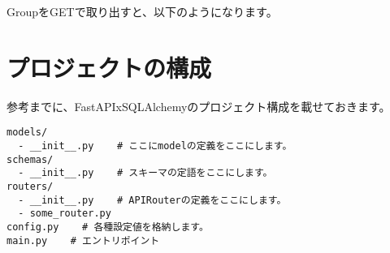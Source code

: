 GroupをGETで取り出すと、以下のようになります。




\section{プロジェクトの構成}
参考までに、FastAPIxSQLAlchemyのプロジェクト構成を載せておきます。

\begin{lstlisting}[caption=プロジェクト構成]
models/
  - __init__.py    # ここにmodelの定義をここにします。
schemas/
  - __init__.py    # スキーマの定語をここにします。
routers/
  - __init__.py    # APIRouterの定義をここにします。
  - some_router.py
config.py    # 各種設定値を格納します。
main.py    # エントリポイント
\end{lstlisting}
